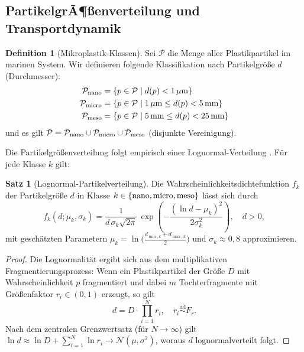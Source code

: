 ﻿\documentclass[12pt,a4paper]{article}
\theoremstyle{definition}
\newtheorem{definition}{Definition}[section]
\newtheorem{theorem}{Satz}[section]
\theoremstyle{remark}
\begin{document}
\subsection{PartikelgrÃ¶\ss{}enverteilung und Transportdynamik}

\begin{definition}[Mikroplastik-Klassen]
Sei $\mathcal{P}$ die Menge aller Plastikpartikel im marinen System.
Wir definieren folgende Klassifikation nach Partikelgr\"o\ss{}e $d$ (Durchmesser):
\begin{align}
  \mathcal{P}_{\rm nano}  &= \{ p \in \mathcal{P} \mid d(p) < 1\,\mu\text{m} \} \\
  \mathcal{P}_{\rm micro} &= \{ p \in \mathcal{P} \mid 1\,\mu\text{m} \leq d(p) < 5\,\text{mm} \} \\
  \mathcal{P}_{\rm meso}  &= \{ p \in \mathcal{P} \mid 5\,\text{mm} \leq d(p) < 25\,\text{mm} \}
\end{align}
und es gilt $\mathcal{P} = \mathcal{P}_{\rm nano} \cup \mathcal{P}_{\rm micro}
\cup \mathcal{P}_{\rm meso}$ (disjunkte Vereinigung).
\end{definition}

Die Partikelgr\"o\ss{}enverteilung folgt empirisch einer Lognormal-Verteilung
\cite{cozar2014plastic, poulain2019small}. F\"ur jede Klasse $k$ gilt:

\begin{theorem}[Lognormal-Partikelverteilung]
Die Wahrscheinlichkeitsdichtefunktion $f_k$ der Partikelgr\"o\ss{}e $d$ in
Klasse $k \in \{{\rm nano, micro, meso}\}$ l\"asst sich durch
\begin{equation}
  f_k(d; \mu_k, \sigma_k) = \frac{1}{d\,\sigma_k\sqrt{2\pi}}\,
  \exp\!\left(-\frac{(\ln d - \mu_k)^2}{2\sigma_k^2}\right), \quad d > 0,
  \label{eq:lognormal}
\end{equation}
mit gesch\"atzten Parametern $\mu_k = \ln\bigl(\frac{d_{\min,k} + d_{\max,k}}{2}\bigr)$
und $\sigma_k \approx 0{,}8$ approximieren.
\end{theorem}

\begin{proof}
Die Lognormalit\"at ergibt sich aus dem multiplikativen Fragmentierungsprozess:
Wenn ein Plastikpartikel der Gr\"o\ss{}e $D$ mit Wahrscheinlichkeit $p$ fragmentiert
und dabei $m$ Tochterfragmente mit Gr\"o\ss{}enfaktor $r_i \in (0,1)$ erzeugt, so gilt
\begin{equation}
  d = D \cdot \prod_{i=1}^{N} r_i, \quad r_i \overset{\text{iid}}{\sim} F_r.
\end{equation}
Nach dem zentralen Grenzwertsatz (f\"ur $N \to \infty$) gilt
$\ln d \approx \ln D + \sum_{i=1}^{N} \ln r_i \to \mathcal{N}(\mu, \sigma^2)$,
woraus $d$ lognormalverteilt folgt.
\end{proof}
\end{document}
